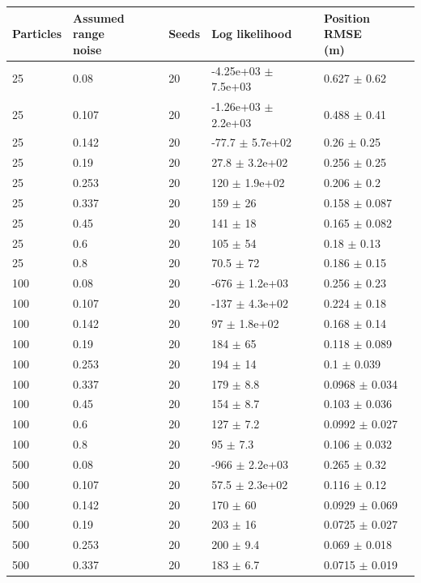 \begin{tabular}{lllll}
\toprule
Particles & \shortstack[l]{Assumed range\\noise} & Seeds & Log likelihood & \shortstack[l]{Position RMSE\\(m)} \\
\midrule
25 & 0.08 & 20 & -4.25e+03 $\pm$ 7.5e+03 & 0.627 $\pm$ 0.62 \\
25 & 0.107 & 20 & -1.26e+03 $\pm$ 2.2e+03 & 0.488 $\pm$ 0.41 \\
25 & 0.142 & 20 & -77.7 $\pm$ 5.7e+02 & 0.26 $\pm$ 0.25 \\
25 & 0.19 & 20 & 27.8 $\pm$ 3.2e+02 & 0.256 $\pm$ 0.25 \\
25 & 0.253 & 20 & 120 $\pm$ 1.9e+02 & 0.206 $\pm$ 0.2 \\
25 & 0.337 & 20 & 159 $\pm$ 26 & 0.158 $\pm$ 0.087 \\
25 & 0.45 & 20 & 141 $\pm$ 18 & 0.165 $\pm$ 0.082 \\
25 & 0.6 & 20 & 105 $\pm$ 54 & 0.18 $\pm$ 0.13 \\
25 & 0.8 & 20 & 70.5 $\pm$ 72 & 0.186 $\pm$ 0.15 \\
100 & 0.08 & 20 & -676 $\pm$ 1.2e+03 & 0.256 $\pm$ 0.23 \\
100 & 0.107 & 20 & -137 $\pm$ 4.3e+02 & 0.224 $\pm$ 0.18 \\
100 & 0.142 & 20 & 97 $\pm$ 1.8e+02 & 0.168 $\pm$ 0.14 \\
100 & 0.19 & 20 & 184 $\pm$ 65 & 0.118 $\pm$ 0.089 \\
100 & 0.253 & 20 & 194 $\pm$ 14 & 0.1 $\pm$ 0.039 \\
100 & 0.337 & 20 & 179 $\pm$ 8.8 & 0.0968 $\pm$ 0.034 \\
100 & 0.45 & 20 & 154 $\pm$ 8.7 & 0.103 $\pm$ 0.036 \\
100 & 0.6 & 20 & 127 $\pm$ 7.2 & 0.0992 $\pm$ 0.027 \\
100 & 0.8 & 20 & 95 $\pm$ 7.3 & 0.106 $\pm$ 0.032 \\
500 & 0.08 & 20 & -966 $\pm$ 2.2e+03 & 0.265 $\pm$ 0.32 \\
500 & 0.107 & 20 & 57.5 $\pm$ 2.3e+02 & 0.116 $\pm$ 0.12 \\
500 & 0.142 & 20 & 170 $\pm$ 60 & 0.0929 $\pm$ 0.069 \\
500 & 0.19 & 20 & 203 $\pm$ 16 & 0.0725 $\pm$ 0.027 \\
500 & 0.253 & 20 & 200 $\pm$ 9.4 & 0.069 $\pm$ 0.018 \\
500 & 0.337 & 20 & 183 $\pm$ 6.7 & 0.0715 $\pm$ 0.019 \\

\end{tabular}
